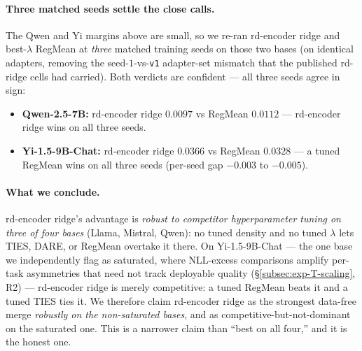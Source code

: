 \paragraph{Three matched seeds settle the close calls.}
The Qwen and Yi margins above are small, so we re-ran rd-encoder ridge and
best-$\lambda$ RegMean at \emph{three} matched training seeds on those two
bases (on identical adapters, removing the seed-$1$-vs-\texttt{v1} adapter-set
mismatch that the published rd-ridge cells had carried). Both verdicts are
confident --- all three seeds agree in sign:
\begin{itemize}
\item \textbf{Qwen-2.5-7B:} rd-encoder ridge $0.0097$ vs RegMean $0.0112$ ---
  rd-encoder ridge wins on all three seeds.
\item \textbf{Yi-1.5-9B-Chat:} rd-encoder ridge $0.0366$ vs RegMean $0.0328$ ---
  a tuned RegMean wins on all three seeds (per-seed gap $-0.003$ to $-0.005$).
\end{itemize}

\paragraph{What we conclude.}
rd-encoder ridge's advantage is \emph{robust to competitor hyperparameter
tuning on three of four bases} (Llama, Mistral, Qwen): no tuned density and no
tuned $\lambda$ lets TIES, DARE, or RegMean overtake it there. On
Yi-1.5-9B-Chat --- the one base we independently flag as saturated, where
NLL-excess comparisons amplify per-task asymmetries that need not track
deployable quality (\S\ref{subsec:exp-T-scaling}, R2) --- rd-encoder ridge is
merely competitive: a tuned RegMean beats it and a tuned TIES ties it. We
therefore claim rd-encoder ridge as the strongest data-free merge \emph{robustly
on the non-saturated bases}, and as competitive-but-not-dominant on the
saturated one. This is a narrower claim than ``best on all four,'' and it is the
honest one.

